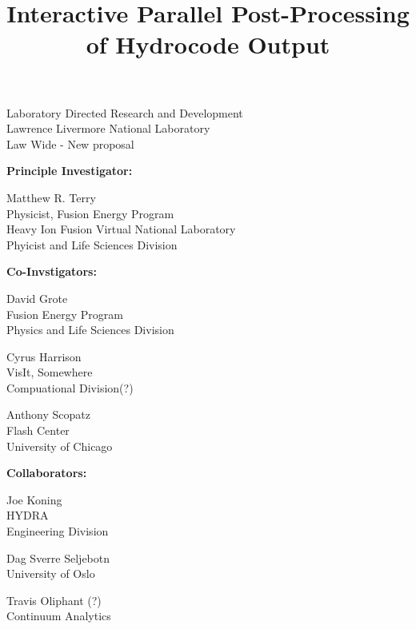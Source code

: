 \documentclass[a4paper]{article}
\title{Interactive Parallel Post-Processing of Hydrocode Output }
\author{}
\date{}
\begin{document}
\maketitle

\setlength{\parindent}{0pt}
\large
Laboratory Directed Research and Development \\
Lawrence Livermore National Laboratory \\
Law Wide - New proposal

\normalsize 
\begin{multicols}{2}
\textbf{Principle Investigator:}
\columnbreak

Matthew R. Terry \\
Physicist, Fusion Energy Program \\
Heavy Ion Fusion Virtual National Laboratory \\
Phyicist and Life Sciences Division

\end{multicols}


\textbf{Co-Invstigators:}
\begin{multicols}{3}
	David Grote \\
	Fusion Energy Program \\
	Physics and Life Sciences Division\\
	\columnbreak
			
	Cyrus Harrison \\
	VisIt, Somewhere \\
	Compuational Division(?) \\
	\columnbreak

	Anthony Scopatz \\
	Flash Center \\
	University of Chicago \\
\end{multicols}

\textbf{Collaborators:}
\begin{multicols}{3}
	Joe Koning \\
	HYDRA \\
	Engineering Division \\
	\columnbreak

	Dag Sverre Seljebotn \\
	University of Oslo \\
	\columnbreak

	Travis Oliphant (?) \\
	Continuum Analytics \\
\end{multicols}
\end{document}
